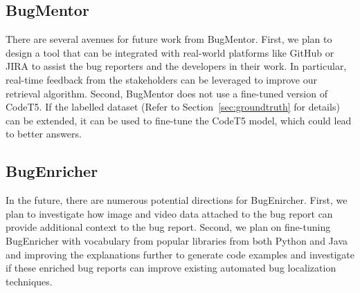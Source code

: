 \subsection{BugMentor}
There are several avenues for future work from BugMentor. First, we plan to design a tool that can be integrated with real-world platforms like GitHub or JIRA to assist the bug reporters and the developers in their work. In particular, real-time feedback from the stakeholders can be leveraged to improve our retrieval algorithm.
Second, BugMentor does not use a fine-tuned version of CodeT5. If the labelled dataset (Refer to Section~\ref{sec:groundtruth} for details) can be extended, it can be used to fine-tune the CodeT5 model, which could lead to better answers.

\subsection{BugEnricher}
In the future, there are numerous potential directions for BugEnircher. First, we plan to investigate how image and video data attached to the bug report can provide additional context to the bug report. Second, we plan on fine-tuning BugEnricher with vocabulary from popular libraries from both Python and Java and improving the explanations further to generate code examples and investigate if these enriched bug reports can improve existing automated bug localization techniques.
 
